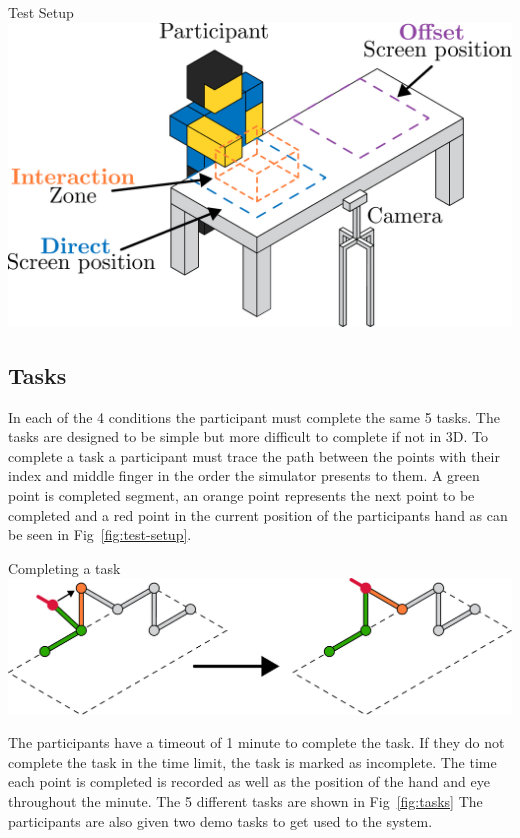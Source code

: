 \begin{figureBox}[label={fig:test-setup}, width=0.8\linewidth]{Test Setup}
    \includegraphics[width = 0.8\linewidth]{./implementation/figures/test-setup.pdf}
\end{figureBox}

\subsection{Tasks}
In each of the 4 conditions the participant must complete the same 5 tasks. The tasks are designed to be simple but more difficult to complete if not in 3D. To complete a task a participant must trace the path between the points with their index and middle finger in the order the simulator presents to them. A green point is completed segment, an orange point represents the next point to be completed and a red point in the current position of the participants hand as can be seen in Fig~\ref{fig:test-setup}. \\ 

\begin{figureBox}[label={fig:task-example}, width=0.8\linewidth]{Completing a task}
    \includegraphics[width = 0.8\linewidth]{./implementation/figures/task-example.pdf}
\end{figureBox}

The participants have a timeout of 1 minute to complete the task. If they do not complete the task in the time limit, the task is marked as incomplete. The time each point is completed is recorded as well as the position of the hand and eye throughout the minute. The 5 different tasks are shown in Fig~\ref{fig:tasks} The participants are also given two demo tasks to get used to the system. \\

